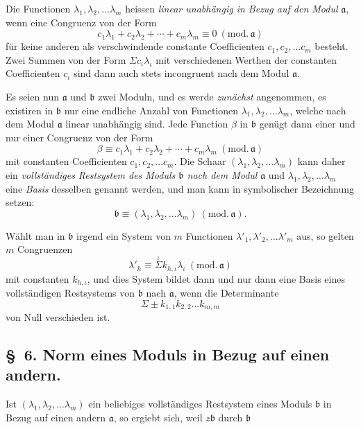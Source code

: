 \documentclass{article}
\begin{document}
Die Functionen $\lambda_{1}, \lambda_{2}, \ldots \lambda_{m}$ heissen \emph{linear unabhängig in Bezug auf den Modul} $\mathfrak{a}$, wenn eine Congruenz von der Form
\[ c_{1}\lambda_{1} + c_{2}\lambda_{2} + \cdots + c_{m}\lambda_{m} \equiv 0 \ (\text{mod.}\,\mathfrak{a}) \]
für keine anderen als verschwindende constante Coefficienten $c_{1}, c_{2}, \ldots c_{m}$ besteht. Zwei Summen von der Form $\Sigma c_{\iota}\lambda_{\iota}$ mit verschiedenen Werthen der constanten Coefficienten $c_{\iota}$ sind dann auch stets incongruent nach dem Modul $\mathfrak{a}$.

Es seien nun $\mathfrak{a}$ und $\mathfrak{b}$ zwei Moduln, und es werde \emph{zunächst} angenommen, es existiren in $\mathfrak{b}$ nur eine endliche Anzahl von Functionen $\lambda_{1}, \lambda_{2}, \ldots \lambda_{m}$, welche nach dem Modul $\mathfrak{a}$ linear unabhängig sind. Jede Function $\beta$ in $\mathfrak{b}$ genügt dann einer und nur einer Congruenz von der Form
\[ \beta \equiv c_{1}\lambda_{1} + c_{2}\lambda_{2} + \cdots + c_{m}\lambda_{m} \ (\text{mod.}\,\mathfrak{a}) \]
mit constanten Coefficienten $c_{1}, c_{2}, \ldots c_{m}$. Die Schaar $(\lambda_{1}, \lambda_{2}, \ldots \lambda_{m})$ kann daher ein \emph{vollständiges Restsystem des Moduls $\mathfrak{b}$ nach dem Modul} $\mathfrak{a}$ und $\lambda_{1}, \lambda_{2}, \ldots \lambda_{m}$ eine \emph{Basis} desselben genannt werden, und man kann in symbolischer Bezeichnung setzen:
\[ \mathfrak{b} \equiv (\lambda_{1}, \lambda_{2}, \ldots \lambda_{m}) \ (\text{mod.}\,\mathfrak{a}). \]

Wählt man in $\mathfrak{b}$ irgend ein System von $m$ Functionen $\lambda'_{1}, \lambda'_{2}, \ldots \lambda'_{m}$ aus, so gelten $m$ Congruenzen
\[ \lambda'_{h} \equiv \overset{\iota}{\Sigma} k_{h,\iota}\lambda_{\iota} \ (\text{mod.}\,\mathfrak{a}) \]
mit constanten $k_{h,\iota}$, und dies System bildet dann und nur dann eine Basis eines vollständigen Restsystems von $\mathfrak{b}$ nach $\mathfrak{a}$, wenn die Determinante
\[ \Sigma \pm k_{1,1}k_{2,2}\ldots k_{m,m} \]
von Null verschieden ist.

\subsection*{§~6. Norm eines Moduls in Bezug auf einen andern.}

Ist $(\lambda_{1}, \lambda_{2}, \ldots \lambda_{m})$ ein beliebiges vollständiges Restsystem eines Moduls $\mathfrak{b}$ in Bezug auf einen andern $\mathfrak{a}$, so ergiebt sich, weil $z\mathfrak{b}$ durch $\mathfrak{b}$
\end{document}
